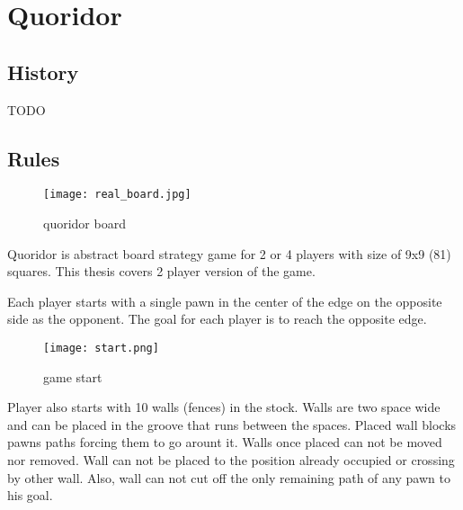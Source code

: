 \chapter{Quoridor}\label{chap:3}

\section{History}
TODO

\section{Rules}
\begin{wrapfigure}{R}{0.4\textwidth}
  \vspace*{-2.80cm}
  \centering
  \texttt{[image: real\_board.jpg]}
  \vspace*{-0.60cm}
  \caption{quoridor board}
  \label{fig:quoridor_board}
  \vspace*{-1.00cm}
\end{wrapfigure}

Quoridor is abstract board strategy game for 2 or 4 players with size of
9x9 (81) squares. This thesis covers 2 player version of the game.

Each player starts with a single pawn in the center of the edge on the
opposite side as the opponent.
The goal for each player is to reach the opposite edge.

\begin{wrapfigure}{L}{0.35\textwidth}
  \vspace*{-0.20cm}
  \centering
  \texttt{[image: start.png]}
  \vspace*{-1.20cm}
  \caption{game start}
  \label{fig:game_start}
  \vspace*{-0.40cm}
\end{wrapfigure}

Player also starts with 10 walls (fences) in the stock.
Walls are two space wide and can be placed in the groove that runs between
the spaces.
Placed wall blocks pawns paths forcing them to go arount it.
Walls once placed can not be moved nor removed.
Wall can not be placed to the position already occupied or crossing by
other wall.
Also, wall can not cut off the only remaining path of any pawn to his goal.

